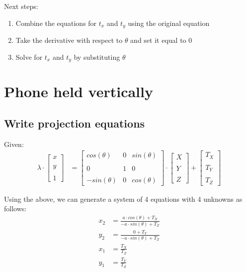 \documentclass[12pt, oneside]{article}
\begin{document}
Next steps: 
\begin{enumerate}
    \item Combine the equations for $t_x$ and $t_y$ using the original equation
    \item Take the derivative with respect to $\theta$ and set it equal to 0
    \item Solve for $t_x$ and $t_y$ by substituting $\theta$
\end{enumerate}


\section{Phone held vertically}

\subsection{Write projection equations}

Given:
\begin{align*}
    \lambda \cdot
    \begin{bmatrix} x \\ \\ y \\ \\ 1 \end{bmatrix}  
    &= 
    \begin{bmatrix} cos(\theta) & 0 & sin(\theta) \\ \\ 
                    0 & 1 & 0\\ \\ 
                    -sin(\theta) & 0 & cos(\theta)
    \end{bmatrix}  \cdot 
    \begin{bmatrix} X \\ \\ Y \\ \\ Z \end{bmatrix}  +
    \begin{bmatrix} T_X \\ \\ T_Y \\ \\ T_Z \end{bmatrix}  
\end{align*}

Using the above, we can generate a system of 4 equations with 4 unknowns as 
follows:
\begin{align*}
    x_2 &= \frac{a \cdot cos(\theta) + T_X}{-a \cdot sin(\theta) + T_Z} \\
    y_2 &= \frac{0 + T_Y}{-a \cdot sin(\theta) + T_Z} \\
    x_1 &= \frac{T_X}{T_Z}  \\
    y_1 &= \frac{T_Y}{T_Z} 
\end{align*}
\end{document}
